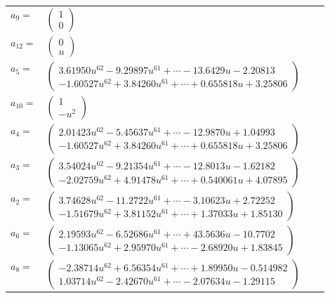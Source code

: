 \documentclass[1p]{elsarticle_modified}
\theoremstyle{definition}
\begin{document}
\begin{tabular}{m{7pt} m{180pt} m{7pt} m{180pt} }
\flushright $a_{9}=$&$\begin{pmatrix}1\\0\end{pmatrix}$ \\
\flushright $a_{12}=$&$\begin{pmatrix}0\\u\end{pmatrix}$ \\
\flushright $a_{5}=$&$\begin{pmatrix}3.61950 u^{62}-9.29897 u^{61}+\cdots-13.6429 u-2.20813\\-1.60527 u^{62}+3.84260 u^{61}+\cdots+0.655818 u+3.25806\end{pmatrix}$ \\
\flushright $a_{10}=$&$\begin{pmatrix}1\\- u^2\end{pmatrix}$ \\
\flushright $a_{4}=$&$\begin{pmatrix}2.01423 u^{62}-5.45637 u^{61}+\cdots-12.9870 u+1.04993\\-1.60527 u^{62}+3.84260 u^{61}+\cdots+0.655818 u+3.25806\end{pmatrix}$ \\
\flushright $a_{3}=$&$\begin{pmatrix}3.54024 u^{62}-9.21354 u^{61}+\cdots-12.8013 u-1.62182\\-2.02759 u^{62}+4.91478 u^{61}+\cdots+0.540061 u+4.07895\end{pmatrix}$ \\
\flushright $a_{2}=$&$\begin{pmatrix}3.74628 u^{62}-11.2722 u^{61}+\cdots-3.10623 u+2.72252\\-1.51679 u^{62}+3.81152 u^{61}+\cdots+1.37033 u+1.85130\end{pmatrix}$ \\
\flushright $a_{6}=$&$\begin{pmatrix}2.19593 u^{62}-6.52686 u^{61}+\cdots+43.5636 u-10.7702\\-1.13065 u^{62}+2.95970 u^{61}+\cdots-2.68920 u+1.83845\end{pmatrix}$ \\
\flushright $a_{8}=$&$\begin{pmatrix}-2.38714 u^{62}+6.56354 u^{61}+\cdots+1.89950 u-0.514982\\1.03714 u^{62}-2.42670 u^{61}+\cdots-2.07634 u-1.29115\end{pmatrix}$ \\

\end{tabular}
\end{document}
